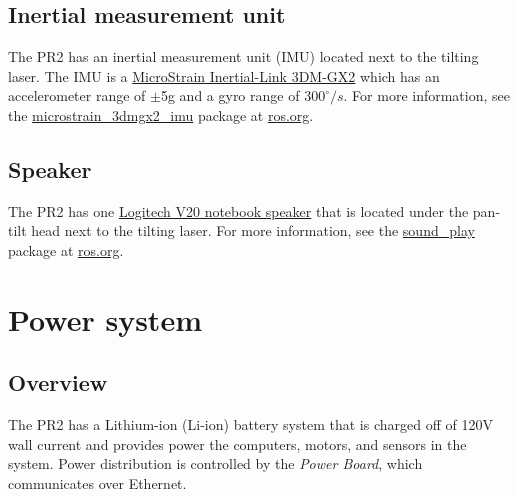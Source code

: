 \subsection{Inertial measurement unit}
The PR2 has an inertial measurement unit (IMU) located next to the tilting laser. The IMU is a 
\href{http://www.microstrain.com/3dm-gx2.aspx}{MicroStrain Inertial-Link 3DM-GX2} which has an 
accelerometer range of $\pm$5g and a gyro range of $300^\circ/s$. For more information, see 
the \href{http://www.ros.org/wiki/microstrain_3dmgx2_imu}{microstrain\_3dmgx2\_imu} package 
at \href{http://www.ros.org}{ros.org}.

\subsection{Speaker}
The PR2 has one \href{http://www.logitech.com/index.cfm/speakers_audio/home_pc_speakers/devices/199&cl=us,en}{Logitech V20 notebook speaker} 
that is located under the pan-tilt head next to the tilting laser. For more information, 
see the \href{http://www.ros.org/wiki/sound_play}{sound\_play} package at \href{http://www.ros.org}{ros.org}.

\section{Power system}
\subsection{Overview}
The PR2 has a Lithium-ion (Li-ion) battery system that is charged off of 120V wall current and provides power the computers, motors, and sensors in the system.  Power distribution is controlled by the {\it Power Board}, which communicates over Ethernet.
